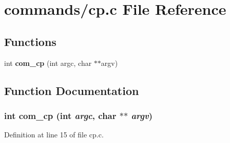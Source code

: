 \section{commands/cp.c File Reference}
\label{cp_8c}
\subsection*{Functions}
\begin{DoxyCompactItemize}
\item 
int {\bf com\_\-cp} (int argc, char $\ast$$\ast$argv)
\end{DoxyCompactItemize}


\subsection{Function Documentation}
\subsubsection[{com\_\-cp}]{\setlength{\rightskip}{0pt plus 5cm}int com\_\-cp (int {\em argc}, \/  char $\ast$$\ast$ {\em argv})}\label{cp_8c_a4188557802d8c8189d397cd93d1b29aa}


Definition at line 15 of file cp.c.

